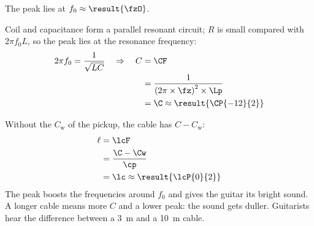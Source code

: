 \begin{abcliste}
\abc The peak lies at $f_0 \approx \result{\fzO}$.

\abc Coil and capacitance form a parallel resonant circuit; $R$ is small compared with $2\pi f_0 L$, so the peak lies at the resonance frequency:
\begin{align}
 2\pi f_0 = \frac{1}{\sqrt{L C}} \quad\Rightarrow\quad C &= \CF \\
   &= \frac{1}{\left(2\pi\times\fz\right)^2\times\Lp} \\
   &= \C \approx \result{\CP{-12}{2}}
\end{align}

\abc Without the $C_\mathrm{w}$ of the pickup, the cable has $C - C_\mathrm{w}$:
\begin{align}
 \ell &= \lcF \\
   &= \frac{\C - \Cw}{\cp} \\
   &= \lc \approx \result{\lcP{0}{2}}
\end{align}
The peak boosts the frequencies around $f_0$ and gives the guitar its bright sound. A longer cable means more $C$ and a lower peak: the sound gets duller. Guitarists hear the difference between a \SI{3}{\meter} and a \SI{10}{\meter} cable.
\end{abcliste}
